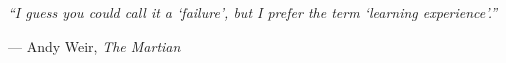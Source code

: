 
\thispagestyle{empty}
\vspace*{0.1\textheight}
\noindent\emph{\enquote{I guess you could call it a \enquote{failure}, but I prefer the term \enquote{learning
experience}.}}\bigbreak

\hfill --- Andy Weir, \textit{The Martian}

\vfill{}
\begin{flushright}
\end{flushright}
\cleardoublepage
